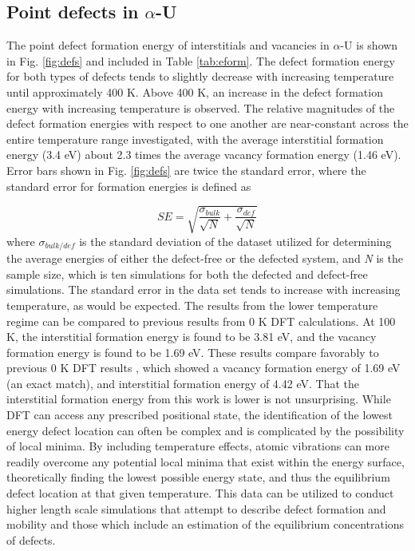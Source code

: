 \documentclass[utf8]{frontiersSCNS} %
\begin{document}
\FloatBarrier

\subsection{Point defects in $\alpha$-U}

The point defect formation energy of interstitials and vacancies in $\alpha$-U is shown in Fig. \ref{fig:defs} and included in Table \ref{tab:eform}. The defect formation energy for both types of defects tends to slightly decrease with increasing temperature until approximately 400 K. Above 400 K, an increase in the defect formation energy with increasing temperature is observed. The relative magnitudes of the defect formation energies with respect to one another are near-constant across the entire temperature range investigated, with the average interstitial formation energy (3.4 eV) about 2.3 times the average vacancy formation energy (1.46 eV). Error bars shown in Fig. \ref{fig:defs} are twice the standard error, where the standard error for formation energies is defined as 

\begin{equation}
\label{eq:surf}
SE = \sqrt{\frac{\sigma_{bulk}}{\sqrt{N}} + \frac{\sigma_{def}}{\sqrt{N}}}
\end{equation}where $\sigma_{bulk/def}$ is the standard deviation of the dataset utilized for determining the average energies of either the defect-free or the defected system, and \textit{N} is the sample size, which is ten simulations for both the defected and defect-free simulations. The standard error in the data set tends to increase with increasing temperature, as would be expected. The results from the lower temperature regime can be compared to previous results from 0 K DFT calculations. At 100 K, the interstitial formation energy is found to be 3.81 eV, and the vacancy formation energy is found to be 1.69 eV. These results compare favorably to previous 0 K DFT results \cite{wirth2011}, which showed a vacancy formation energy of 1.69 eV (an exact match), and interstitial formation energy of 4.42 eV. That the interstitial formation energy from this work is lower is not unsurprising. While DFT can access any prescribed positional state, the identification of the lowest energy defect location can often be complex and is complicated by the possibility of local minima. By including temperature effects, atomic vibrations can more readily overcome any potential local minima that exist within the energy surface, theoretically finding the lowest possible energy state, and thus the equilibrium defect location at that given temperature. This data can be utilized to conduct higher length scale simulations that attempt to describe defect formation and mobility and those which include an estimation of the equilibrium concentrations of defects. 
 
\end{document}
